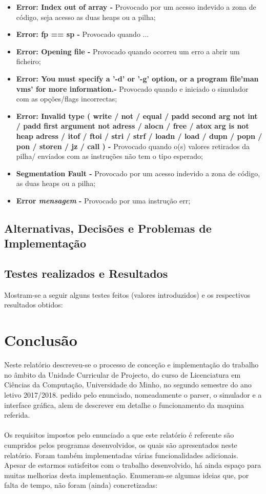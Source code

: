 \documentclass{report}
\begin{document}
\begin{itemize}
\item \textbf{Error: Index out of array - } Provocado por um acesso indevido a zona de código, seja acesso as duas heaps ou a pilha;
\item \textbf{Error: fp == sp - } Provocado quando ...
\item \textbf{Error: Opening file - } Provocado quando ocorreu um erro a abrir um ficheiro;
\item \textbf{Error: You must specify a '-d' or '-g' option, or a program file\nTry 'man vms' for more information.\n - } Provocado quando e iniciado o simulador
com as opções/flags incorrectas;
\item \textbf{Error: Invalid type ( write / not / equal / padd second arg not int / padd first argument not adress / alocn / free /
 atox arg is not heap adress / itof / ftoi / stri / strf / loadn / load / dupn / popn / pon / storen / jz / call ) - } Provocado
 quando o(s) valores retirados da pilha/ enviados com as instruções não tem o tipo esperado;
\item \textbf{Segmentation Fault - } Provocado por um acesso indevido a zona de código, as duas heaps ou a pilha;
\item \textbf{Error \textit{mensagem} - } Provocado por uma instrução err;
\end{itemize}

\section{Alternativas, Decisões e Problemas de Implementação}
\section{Testes realizados e Resultados}
Mostram-se a seguir alguns testes feitos (valores introduzidos) e
os respectivos resultados obtidos:

\chapter{Conclusão} \label{concl}
\quad Neste relatório descreveu-se o processo de conceção e implementação do trabalho no
âmbito da Unidade Curricular de Projecto, do curso de Licenciatura em Ciências da Computação, Universidade do Minho, no
segundo semestre do ano letivo 2017/2018. pedido pelo
enunciado, nomeadamente o parser, o simulador e a interface gráfica, alem de descrever em detalhe
o funcionamento da maquina referida.\\\\
\null\quad Os requisitos impostos pelo enunciado a que este relatório é referente são cumpridos pelos programas desenvolvidos,
os quais são apresentados neste relatório. Foram também implementadas várias funcionalidades adicionais.\\
\null\quad Apesar de estarmos satisfeitos com o trabalho desenvolvido, há ainda espaço para muitas
melhorias desta implementação. Enumeram-se algumas ideias que, por falta de tempo, não foram
(ainda) concretizadas:
\end{document}
